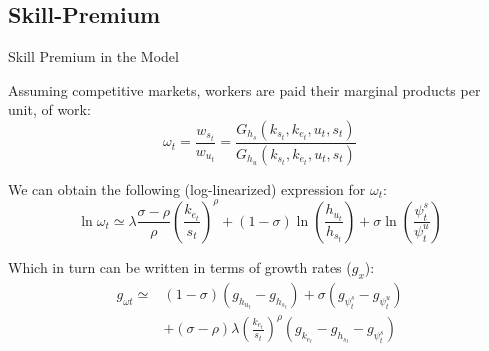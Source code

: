 \documentclass[notes,11pt, aspectratio=169]{beamer}
\newenvironment{wideitemize}{\itemize\addtolength{\itemsep}{10pt}}{\enditemize}
\begin{document}
\subsection{Skill-Premium}
\begin{frame}{Skill Premium in the Model}
 
 \begin{wideitemize}
 \item Assuming competitive markets, workers are paid their marginal products per unit, of work:
 \begin{equation*}
 \omega_t = \frac{w_{s_t}}{w_{u_t}} = \frac{G_{h_s}(k_{s_t}, k_{e_t}, u_t, s_t) }{G_{h_u}(k_{s_t}, k_{e_t}, u_t, s_t) }
 \end{equation*}
 \item We can obtain the following (log-linearized) expression for $\omega_t$:
 \begin{equation}\label{eq:skill_premium_log_linear}
 \ln \omega_{t} \simeq \lambda \frac{\sigma-\rho}{\rho}\left(\frac{k_{e_t}}{s_{t}}\right)^{\rho}+(1-\sigma) \ln \left(\frac{h_{u_t}}{h_{s_t}}\right)+\sigma \ln \left(\frac{\psi^s_t}{\psi^u_t}\right)
 \end{equation}
 \item Which in turn can be written in terms of growth rates ($g_x$):
 \begin{equation}\label{eq:skill_premium_growth_rates}
 \begin{aligned}
 g_{\omega t} \simeq &(1-\sigma)\left(g_{h_{u_t}}-g_{h_{s_t}}\right)+\sigma\left(g_{\psi^s_t}-g_{\psi^u_t}\right) \\
 &+(\sigma-\rho) \lambda\left(\frac{k_{e_t}}{s_{t}}\right)^{\rho}\left(g_{k_{e_t}}-g_{h_{s_t}}-g_{\psi^s_t}\right) 
 \end{aligned}
 \end{equation}
 \end{wideitemize}
\end{frame}
\end{document}
